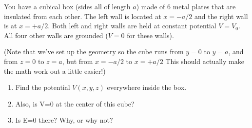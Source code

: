 \documentclass[11pt]{article}
\def\tightlist{}
\begin{document}
You have a cubical box (sides all of length \(a\)) made of 6 metal
plates that are insulated from each other. The left wall is located at
\(x=-a/2\) and the right wall is at \(x=+a/2\). Both left and right
walls are held at constant potential \(V=V_0\). All four other walls are
grounded (\(V=0\) for these walls).

(Note that we've set up the geometry so the cube runs from \(y=0\) to
\(y=a\), and from \(z=0\) to \(z=a\), but from \(x=-a/2\) to \(x=+a/2\)
This should actually make the math work out a little easier!)

\begin{enumerate}
\def\labelenumi{\arabic{enumi}.}
\tightlist
\item
  Find the potential \(V(x,y,z)\) everywhere inside the box.
\item
  Also, is V=0 at the center of this cube?
\item
  Is E=0 there? Why, or why not?
\end{enumerate}
\end{document}
